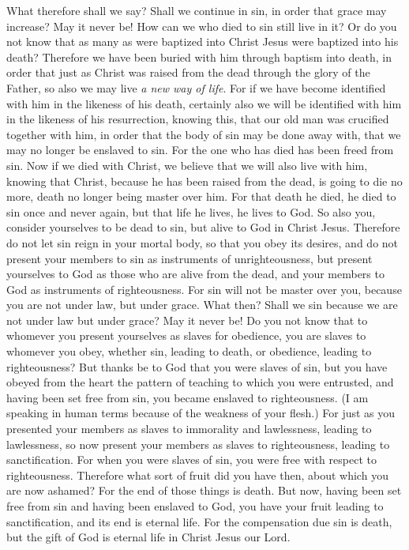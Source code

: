 \begin{biblechapter} %
 What therefore shall we say? Shall we continue in sin, in order that grace may increase?
\verse May it never be! How can we who died to sin still live in it?
\verse Or do you not know that as many as were baptized into Christ Jesus were baptized into his death?
\verse Therefore we have been buried with him through baptism into death, in order that just as Christ was raised from the dead through the glory of the Father, so also we may live \textit{a new way of life}.
\verse For if we have become identified with him in the likeness of his death, certainly also we will be identified with him in the likeness of his resurrection,
\verse knowing this, that our old man was crucified together with him, in order that the body of sin may be done away with, that we may no longer be enslaved to sin.
\verse For the one who has died has been freed from sin.
\verse Now if we died with Christ, we believe that we will also live with him,
\verse knowing that Christ, because he has been raised from the dead, is going to die no more, death no longer being master over him.
\verse For that death he died, he died to sin once and never again, but that life he lives, he lives to God.
\verse So also you, consider yourselves to be dead to sin, but alive to God in Christ Jesus.
\verse Therefore do not let sin reign in your mortal body, so that you obey its desires,
\verse and do not present your members to sin as instruments of unrighteousness, but present yourselves to God as those who are alive from the dead, and your members to God as instruments of righteousness.
\verse For sin will not be master over you, because you are not under law, but under grace.
 What then? Shall we sin because we are not under law but under grace? May it never be!
\verse Do you not know that to whomever you present yourselves as slaves for obedience, you are slaves to whomever you obey, whether sin, leading to death, or obedience, leading to righteousness?
\verse But thanks be to God that you were slaves of sin, but you have obeyed from the heart the pattern of teaching to which you were entrusted,
\verse and having been set free from sin, you became enslaved to righteousness.
\verse (I am speaking in human terms because of the weakness of your flesh.) For just as you presented your members as slaves to immorality and lawlessness, leading to lawlessness, so now present your members as slaves to righteousness, leading to sanctification.
\verse For when you were slaves of sin, you were free with respect to righteousness.
\verse Therefore what sort of fruit did you have then, about which you are now ashamed? For the end of those things is death.
\verse But now, having been set free from sin and having been enslaved to God, you have your fruit leading to sanctification, and its end is eternal life.
\verse For the compensation due sin is death, but the gift of God is eternal life in Christ Jesus our Lord.
\end{biblechapter}

